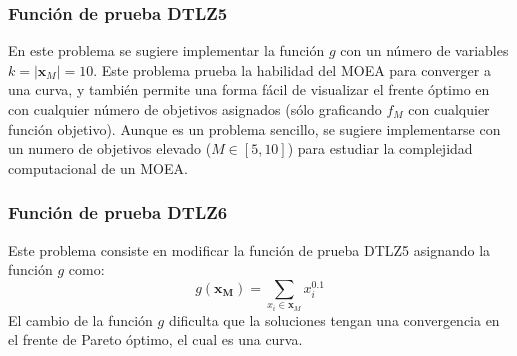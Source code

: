 \subsubsection*{Función de prueba DTLZ5}

En este problema se sugiere implementar la función $g$ con un número de variables $k = |\mathbf{x}_M| = 10$.
%
Este problema prueba la habilidad del MOEA para converger a una curva, y también permite una forma fácil de visualizar el frente óptimo en con cualquier número de objetivos asignados (sólo graficando $f_M$ con cualquier función objetivo).
%
Aunque es un problema sencillo, se sugiere implementarse con un numero de objetivos elevado ($M \in [5, 10]$) para estudiar la complejidad computacional de un MOEA.

\subsubsection*{Función de prueba DTLZ6}
Este problema consiste en modificar la función de prueba DTLZ5 asignando la función $g$ como:
\begin{equation*}
 g( \mathbf{x_M}) = \sum_{x_i \in \mathbf{x}_M} x_i^{0.1}
\end{equation*}
%
El cambio de la función $g$ dificulta que la soluciones tengan una convergencia en el frente de Pareto óptimo, el cual es una curva.

